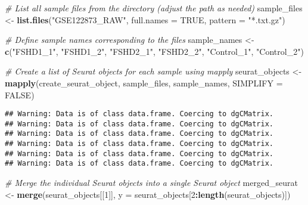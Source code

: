 \documentclass[
]{article}
\newenvironment{Shaded}{\begin{snugshade}}{\end{snugshade}}
\newcommand{\AttributeTok}[1]{\textcolor[rgb]{0.13,0.29,0.53}{#1}}
\newcommand{\CommentTok}[1]{\textcolor[rgb]{0.56,0.35,0.01}{\textit{#1}}}
\newcommand{\ConstantTok}[1]{\textcolor[rgb]{0.56,0.35,0.01}{#1}}
\newcommand{\DecValTok}[1]{\textcolor[rgb]{0.00,0.00,0.81}{#1}}
\newcommand{\FunctionTok}[1]{\textcolor[rgb]{0.13,0.29,0.53}{\textbf{#1}}}
\newcommand{\NormalTok}[1]{#1}
\newcommand{\OtherTok}[1]{\textcolor[rgb]{0.56,0.35,0.01}{#1}}
\newcommand{\SpecialCharTok}[1]{\textcolor[rgb]{0.81,0.36,0.00}{\textbf{#1}}}
\newcommand{\StringTok}[1]{\textcolor[rgb]{0.31,0.60,0.02}{#1}}
\begin{document}
\begin{Shaded}
\begin{Highlighting}[]
\CommentTok{\# List all sample files from the directory (adjust the path as needed)}
\NormalTok{sample\_files }\OtherTok{\textless{}{-}} \FunctionTok{list.files}\NormalTok{(}\StringTok{"GSE122873\_RAW"}\NormalTok{, }\AttributeTok{full.names =} \ConstantTok{TRUE}\NormalTok{, }\AttributeTok{pattern =} \StringTok{"*.txt.gz"}\NormalTok{)}

\CommentTok{\# Define sample names corresponding to the files}
\NormalTok{sample\_names }\OtherTok{\textless{}{-}} \FunctionTok{c}\NormalTok{(}\StringTok{"FSHD1\_1"}\NormalTok{, }\StringTok{"FSHD1\_2"}\NormalTok{, }\StringTok{"FSHD2\_1"}\NormalTok{, }\StringTok{"FSHD2\_2"}\NormalTok{, }\StringTok{"Control\_1"}\NormalTok{, }\StringTok{"Control\_2"}\NormalTok{)}

\CommentTok{\# Create a list of Seurat objects for each sample using mapply}
\NormalTok{seurat\_objects }\OtherTok{\textless{}{-}} \FunctionTok{mapply}\NormalTok{(create\_seurat\_object, }
\NormalTok{                         sample\_files, }
\NormalTok{                         sample\_names,}
                         \AttributeTok{SIMPLIFY =} \ConstantTok{FALSE}\NormalTok{)}
\end{Highlighting}
\end{Shaded}

\begin{verbatim}
## Warning: Data is of class data.frame. Coercing to dgCMatrix.
## Warning: Data is of class data.frame. Coercing to dgCMatrix.
## Warning: Data is of class data.frame. Coercing to dgCMatrix.
## Warning: Data is of class data.frame. Coercing to dgCMatrix.
## Warning: Data is of class data.frame. Coercing to dgCMatrix.
## Warning: Data is of class data.frame. Coercing to dgCMatrix.
\end{verbatim}

\begin{Shaded}
\begin{Highlighting}[]
\CommentTok{\# Merge the individual Seurat objects into a single Seurat object}
\NormalTok{merged\_seurat }\OtherTok{\textless{}{-}} \FunctionTok{merge}\NormalTok{(seurat\_objects[[}\DecValTok{1}\NormalTok{]], }
                       \AttributeTok{y =}\NormalTok{ seurat\_objects[}\DecValTok{2}\SpecialCharTok{:}\FunctionTok{length}\NormalTok{(seurat\_objects)])}
\end{Highlighting}
\end{Shaded}
\end{document}
